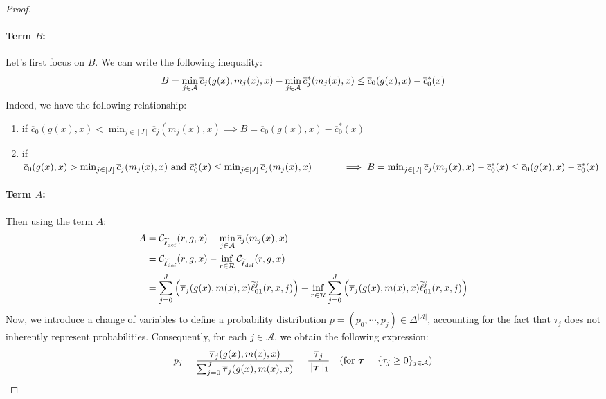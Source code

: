 \begin{appendices}
\begin{proof}
\paragraph{Term $B$:} Let's first focus on $B$. We can write the following inequality:
\begin{equation}
    B = \min_{j\in\mathcal{A}}\overline{c}_j(g(x), m_j(x),x) - \min_{j\in\mathcal{A}}\overline{c}^\ast_j(m_j(x),x) \leq \overline{c}_0(g(x),x) - \overline{c}^\ast_0(x)
\end{equation}
Indeed, we have the following relationship:
\begin{enumerate}
    \item if $\overline{c}_0(g(x),x) < \min_{j\in[J]}\overline{c}_{j}(m_j(x),x) \implies B = \overline{c}_0(g(x),x) - \overline{c}^\ast_0(x)$
    \item if $\overline{c}_0(g(x),x) > \min_{j\in[J]}\overline{c}_j(m_j(x),x)  \text{ and } \overline{c}^\ast_0(x) \leq \min_{j\in[J]}\overline{c}_{j}(m_j(x),x) \\
    \quad \quad \quad \implies B = \min_{j\in[J]}\overline{c}_{j}(m_j(x),x) - \overline{c}^\ast_0(x)\leq \overline{c}_0(g(x),x) - \overline{c}^\ast_0(x)$
\end{enumerate}
\paragraph{Term $A$:} Then using the term $A$:
\begin{equation}
    \begin{aligned}
        A & = \mathcal{C}_{\widetilde{\ell}_{\text{def}}}(r,g,x) - \min_{j\in\mathcal{A}}\overline{c}_j(m_j(x),x) \\
        & = \mathcal{C}_{\widetilde{\ell}_{\text{def}}}(r,g,x) - \inf_{r\in\mathcal{R}} \mathcal{C}_{\widetilde{\ell}_{\text{def}}}(r,g,x) \\
        & = \sum_{j=0}^J \Big(\overline{\tau}_j(g(x),m(x),x)\widetilde{\ell}_{01}^j(r,x,j)\Big) - \inf_{r\in\mathcal{R}}\sum_{j=0}^J \Big(\overline{\tau}_j(g(x),m(x),x)\widetilde{\ell}_{01}^j(r,x,j)\Big)
    \end{aligned}
\end{equation}
Now, we introduce a change of variables to define a probability distribution \( p = (p_0, \cdots, p_j) \in \Delta^{|\mathcal{A}|} \), accounting for the fact that \( \tau_j \) does not inherently represent probabilities. Consequently, for each \( j \in \mathcal{A} \), we obtain the following expression:
\begin{equation}
    p_j = \frac{\overline{\tau}_j(g(x),m(x),x)}{\sum_{j=0}^J \overline{\tau}_j(g(x),m(x),x)}  = \frac{\overline{\tau}_j}{\|\boldsymbol{\tau}\|_1} \quad \text{(for $\boldsymbol{\tau}=\{\tau_j\geq 0\}_{j\in\mathcal{A}}$)} 
\end{equation}



\end{proof}
\end{appendices}
